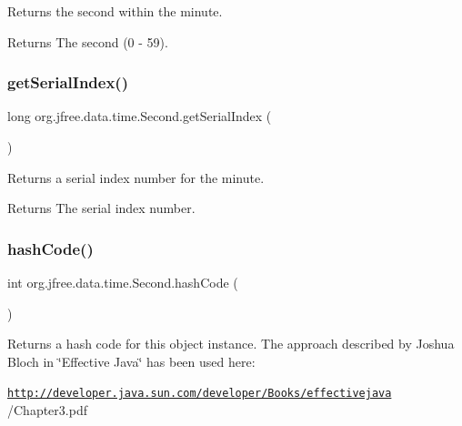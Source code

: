 Returns the second within the minute.

\begin{DoxyReturn}{Returns}
The second (0 -\/ 59). 
\end{DoxyReturn}
\mbox{\label{classorg_1_1jfree_1_1data_1_1time_1_1_second_a3e84e608f1a6a45ca2137ef54f29da38}} 
\subsubsection{\texorpdfstring{get\+Serial\+Index()}{getSerialIndex()}}
{\footnotesize\ttfamily long org.\+jfree.\+data.\+time.\+Second.\+get\+Serial\+Index (\begin{DoxyParamCaption}{ }\end{DoxyParamCaption})}

Returns a serial index number for the minute.

\begin{DoxyReturn}{Returns}
The serial index number. 
\end{DoxyReturn}
\mbox{\label{classorg_1_1jfree_1_1data_1_1time_1_1_second_a4d21b0d91740b6a494285ec81f856b1f}} 
\subsubsection{\texorpdfstring{hash\+Code()}{hashCode()}}
{\footnotesize\ttfamily int org.\+jfree.\+data.\+time.\+Second.\+hash\+Code (\begin{DoxyParamCaption}{ }\end{DoxyParamCaption})}

Returns a hash code for this object instance. The approach described by Joshua Bloch in \char`\"{}\+Effective Java\char`\"{} has been used here\+: 

{\ttfamily \href{http://developer.java.sun.com/developer/Books/effectivejava}{\tt http\+://developer.\+java.\+sun.\+com/developer/\+Books/effectivejava} /\+Chapter3.pdf}

